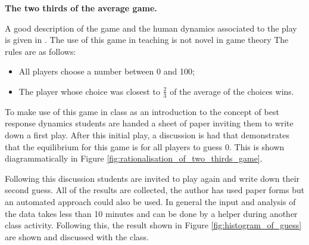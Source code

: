 \documentclass{article}
\begin{document}
\begin{center}
    \textbf{The two thirds of the average game.}
\end{center}

A good description of the game and the human dynamics associated to the play is
given in \cite{Nagel1995}.  The use of this game in teaching is not novel in
game theory \cite{TheEconomicsNetwork2013}
The rules are as follows:

\begin{itemize}
    \item All players choose a number between 0 and 100;
    \item The player whose choice was closest to \(\frac{2}{3}\) of the average
        of the choices wins.
\end{itemize}

To make use of this game in class as an introduction to the concept of best
response dynamics students are handed a sheet of paper inviting them to write
down a first play. After this initial play, a discussion is had that
demonstrates that the equilibrium for this game is for all players to guess 0.
This is shown diagrammatically in Figure
\ref{fig:rationalisation_of_two_thirds_game}.

Following this discussion students are invited to play again and write down
their second guess. All of the results are collected, the author has used paper
forms but an automated approach could also be used. In general the input and
analysis of the data takes less than 10 minutes and can be done by a helper
during another class activity.
Following this, the result shown in Figure \ref{fig:histogram_of_guess} are
shown and discussed with the class.
\end{document}
